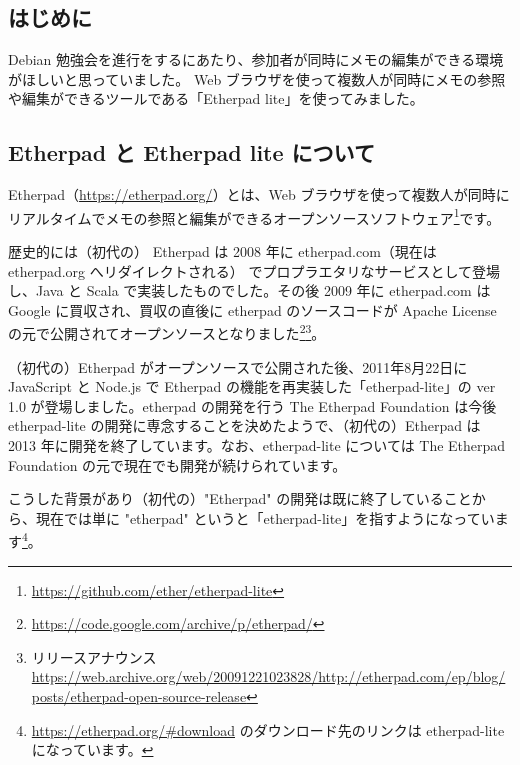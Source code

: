 \documentclass[mingoth,a4paper]{jsarticle}
\begin{document}


\subsection{はじめに}

Debian 勉強会を進行をするにあたり、参加者が同時にメモの編集ができる環境がほしいと思っていました。
Web ブラウザを使って複数人が同時にメモの参照や編集ができるツールである「Etherpad lite」を使ってみました。

\subsection{Etherpad と Etherpad lite について}

Etherpad（\url{https://etherpad.org/}）とは、Web ブラウザを使って複数人が同時にリアルタイムでメモの参照と編集ができるオープンソースソフトウェア\footnote{\url{https://github.com/ether/etherpad-lite}}です。

歴史的には（初代の） Etherpad は 2008 年に etherpad.com（現在は etherpad.org へリダイレクトされる） でプロプラエタリなサービスとして登場し、Java と Scala で実装したものでした。その後 2009 年に etherpad.com は Google に買収され、買収の直後に etherpad のソースコードが Apache License の元で公開されてオープンソースとなりました\footnote{\url{https://code.google.com/archive/p/etherpad/}}\footnote{リリースアナウンス \url{https://web.archive.org/web/20091221023828/http://etherpad.com/ep/blog/posts/etherpad-open-source-release}}。

（初代の）Etherpad がオープンソースで公開された後、2011年8月22日に JavaScript と Node.js で Etherpad の機能を再実装した「etherpad-lite」の ver 1.0 が登場しました。etherpad の開発を行う The Etherpad Foundation は今後 etherpad-lite の開発に専念することを決めたようで、（初代の）Etherpad は 2013 年に開発を終了しています。なお、etherpad-lite については The Etherpad Foundation の元で現在でも開発が続けられています。

こうした背景があり（初代の）"Etherpad" の開発は既に終了していることから、現在では単に "etherpad" というと「etherpad-lite」を指すようになっています\footnote{\url{https://etherpad.org/\#download} のダウンロード先のリンクは etherpad-lite になっています。}。
\end{document}
